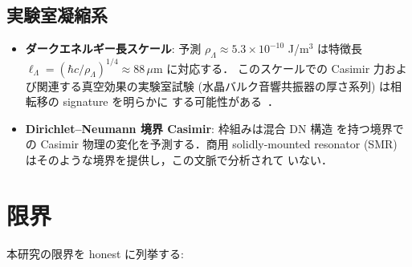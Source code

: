 \documentclass[11pt,a4paper]{article}
\begin{document}
\subsection{実験室凝縮系}

\begin{itemize}
\item \textbf{ダークエネルギー長スケール}: 予測
$\rho_\Lambda \approx 5.3 \times 10^{-10}$ J/m$^3$ は特徴長
$\ell_\Lambda = (\hbar c/\rho_\Lambda)^{1/4} \approx 88\,\mu$m に対応する．
このスケールでの Casimir 力および関連する真空効果の実験室試験
(水晶バルク音響共振器の厚さ系列) は相転移の signature を明らかに
する可能性がある~\cite{wb-bawguide}．

\item \textbf{Dirichlet--Neumann 境界 Casimir}: 枠組みは混合 DN 構造
を持つ境界での Casimir 物理の変化を予測する．商用 solidly-mounted
resonator (SMR) はそのような境界を提供し，この文脈で分析されて
いない．
\end{itemize}

\section{限界}
\label{sec:limitations}

本研究の限界を honest に列挙する:
\end{document}
